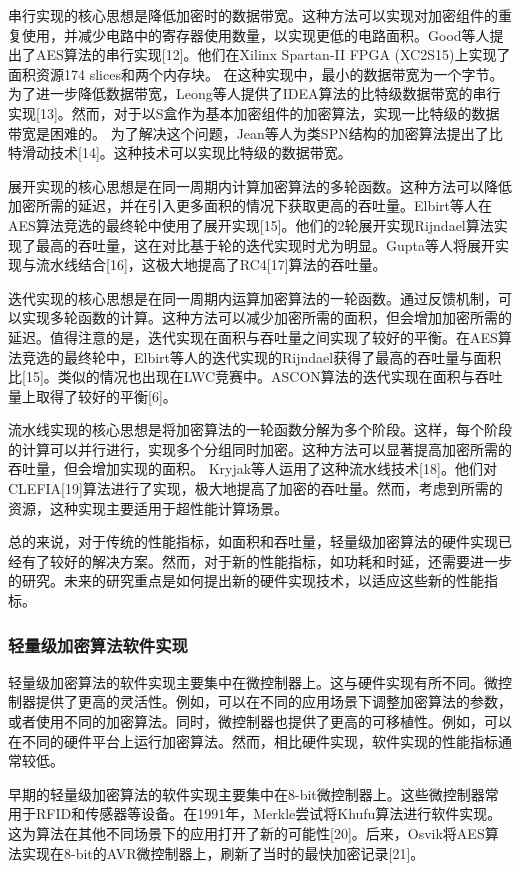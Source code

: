 \documentclass{ctexart}
\begin{document}
串行实现的核心思想是降低加密时的数据带宽。这种方法可以实现对加密组件的重复使用，并减少电路中的寄存器使用数量，以实现更低的电路面积。Good等人提出了AES算法的串行实现[12]。他们在Xilinx Spartan-II FPGA (XC2S15)上实现了面积资源174 slices和两个内存块。
在这种实现中，最小的数据带宽为一个字节。为了进一步降低数据带宽，Leong等人提供了IDEA算法的比特级数据带宽的串行实现[13]。然而，对于以S盒作为基本加密组件的加密算法，实现一比特级的数据带宽是困难的。
为了解决这个问题，Jean等人为类SPN结构的加密算法提出了比特滑动技术[14]。这种技术可以实现比特级的数据带宽。

展开实现的核心思想是在同一周期内计算加密算法的多轮函数。这种方法可以降低加密所需的延迟，并在引入更多面积的情况下获取更高的吞吐量。Elbirt等人在AES算法竞选的最终轮中使用了展开实现[15]。他们的2轮展开实现Rijndael算法实现了最高的吞吐量，这在对比基于轮的迭代实现时尤为明显。Gupta等人将展开实现与流水线结合[16]，这极大地提高了RC4[17]算法的吞吐量。

迭代实现的核心思想是在同一周期内运算加密算法的一轮函数。通过反馈机制，可以实现多轮函数的计算。这种方法可以减少加密所需的面积，但会增加加密所需的延迟。值得注意的是，迭代实现在面积与吞吐量之间实现了较好的平衡。在AES算法竞选的最终轮中，Elbirt等人的迭代实现的Rijndael获得了最高的吞吐量与面积比[15]。类似的情况也出现在LWC竞赛中。ASCON算法的迭代实现在面积与吞吐量上取得了较好的平衡[6]。

流水线实现的核心思想是将加密算法的一轮函数分解为多个阶段。这样，每个阶段的计算可以并行进行，实现多个分组同时加密。这种方法可以显著提高加密所需的吞吐量，但会增加实现的面积。
Kryjak等人运用了这种流水线技术[18]。他们对CLEFIA[19]算法进行了实现，极大地提高了加密的吞吐量。然而，考虑到所需的资源，这种实现主要适用于超性能计算场景。

总的来说，对于传统的性能指标，如面积和吞吐量，轻量级加密算法的硬件实现已经有了较好的解决方案。然而，对于新的性能指标，如功耗和时延，还需要进一步的研究。未来的研究重点是如何提出新的硬件实现技术，以适应这些新的性能指标。

\subsubsection{轻量级加密算法软件实现}
轻量级加密算法的软件实现主要集中在微控制器上。这与硬件实现有所不同。微控制器提供了更高的灵活性。例如，可以在不同的应用场景下调整加密算法的参数，或者使用不同的加密算法。同时，微控制器也提供了更高的可移植性。例如，可以在不同的硬件平台上运行加密算法。然而，相比硬件实现，软件实现的性能指标通常较低。

早期的轻量级加密算法的软件实现主要集中在8-bit微控制器上。这些微控制器常用于RFID和传感器等设备。在1991年，Merkle尝试将Khufu算法进行软件实现。这为算法在其他不同场景下的应用打开了新的可能性[20]。后来，Osvik将AES算法实现在8-bit的AVR微控制器上，刷新了当时的最快加密记录[21]。
\end{document}
